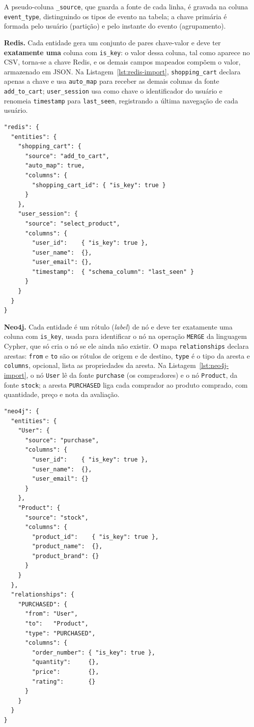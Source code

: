A pseudo-coluna \texttt{\_source}, que guarda a fonte de cada linha, é gravada na coluna
\texttt{event\_type}, distinguindo os tipos de evento na tabela; a chave primária é
formada pelo usuário (partição) e pelo instante do evento (agrupamento).

\textbf{Redis.} Cada entidade gera um conjunto de pares chave-valor e deve ter
\textbf{exatamente uma} coluna com \texttt{is\_key}: o valor dessa coluna, tal como aparece
no CSV, torna-se a chave Redis, e os demais campos mapeados compõem o valor, armazenado em
JSON. Na Listagem~\ref{lst:redis-import}, \texttt{shopping\_cart} declara apenas a chave e
usa \texttt{auto\_map} para receber as demais colunas da fonte \texttt{add\_to\_cart};
\texttt{user\_session} usa como chave o identificador do usuário e renomeia
\texttt{timestamp} para \texttt{last\_seen}, registrando a última navegação de cada
usuário.

\begin{lstlisting}[style=jsonstyle,caption={Fragmento de importação Redis (cenário exemplo), com mapeamento automático.},label={lst:redis-import}]
"redis": {
  "entities": {
    "shopping_cart": {
      "source": "add_to_cart",
      "auto_map": true,
      "columns": {
        "shopping_cart_id": { "is_key": true }
      }
    },
    "user_session": {
      "source": "select_product",
      "columns": {
        "user_id":    { "is_key": true },
        "user_name":  {},
        "user_email": {},
        "timestamp":  { "schema_column": "last_seen" }
      }
    }
  }
}
\end{lstlisting}

\textbf{Neo4j.} Cada entidade é um rótulo (\textit{label}) de nó e deve ter exatamente uma
coluna com \texttt{is\_key}, usada para identificar o nó na operação \texttt{MERGE} da
linguagem Cypher, que só cria o nó se ele ainda não existir. O mapa
\texttt{relationships} declara arestas: \texttt{from} e \texttt{to} são os rótulos de
origem e de destino, \texttt{type} é o tipo da aresta e \texttt{columns}, opcional, lista as
propriedades da aresta. Na Listagem~\ref{lst:neo4j-import}, o nó \texttt{User} lê da fonte
\texttt{purchase} (os compradores) e o nó \texttt{Product}, da fonte \texttt{stock}; a
aresta \texttt{PURCHASED} liga cada comprador ao produto comprado, com quantidade, preço e
nota da avaliação.

\begin{lstlisting}[style=jsonstyle,caption={Fragmento de importação Neo4j (nós e aresta).},label={lst:neo4j-import}]
"neo4j": {
  "entities": {
    "User": {
      "source": "purchase",
      "columns": {
        "user_id":    { "is_key": true },
        "user_name":  {},
        "user_email": {}
      }
    },
    "Product": {
      "source": "stock",
      "columns": {
        "product_id":    { "is_key": true },
        "product_name":  {},
        "product_brand": {}
      }
    }
  },
  "relationships": {
    "PURCHASED": {
      "from": "User",
      "to":   "Product",
      "type": "PURCHASED",
      "columns": {
        "order_number": { "is_key": true },
        "quantity":     {},
        "price":        {},
        "rating":       {}
      }
    }
  }
}
\end{lstlisting}

